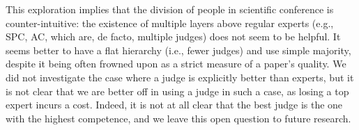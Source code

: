 \documentclass[letterpaper]{article} %
\newcommand{\omer}[1]{\textcolor{purple}{Omer says: #1}}
\newcommand{\nickin}[1]{\todo[color=kentuckyblue!40,inline]{Nick says: #1}}
\begin{document}
This exploration implies that the division of people in scientific conference is counter-intuitive: the existence of multiple layers above regular experts (e.g., SPC, AC, which are, de facto, multiple judges) does not seem to be helpful. It seems better to have a flat hierarchy (i.e., fewer judges) and use simple majority, despite it being often frowned upon as a strict measure of a paper's quality. We did not investigate the case where a judge is explicitly better than experts, but it is not clear that we are better off in using a judge in such a case, as losing a top expert incurs a cost. Indeed, it is not at all clear that the best judge is the one with the highest competence, and we leave this open question to future research.%
\end{document}

